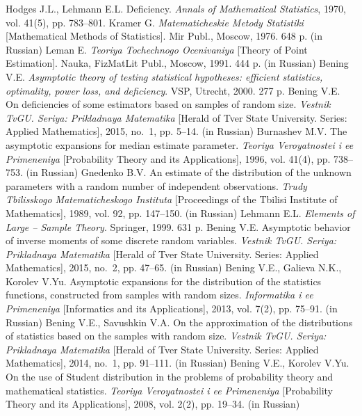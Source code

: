 \documentclass[a4paper,twoside]{article}
\theoremstyle{theorem}
\theoremstyle{remark}
\begin{document}
\bigskip\bigskip{}
\begin{thebibliography}{99}
\bibitem{} Hodges J.L., Lehmann E.L. Deficiency. {\it Annals of Mathematical Statistics}, 1970, vol. 41(5), pp. 783--801.
\bibitem{} Kramer G. {\it Matematicheskie Metody Statistiki} [Mathematical Methods of Statistics]. Mir Publ., Moscow, 1976. 648 p. (in Russian)
\bibitem{} Leman E. {\it Teoriya Tochechnogo Ocenivaniya} [Theory of Point Estimation]. Nauka, FizMatLit Publ., Moscow, 1991. 444 p. (in Russian)
\bibitem{} Bening V.E. {\it Asymptotic theory of testing statistical hypotheses: efficient statistics, optimality, power loss, and deficiency}. VSP, Utrecht, 2000. 277 p.
\bibitem{} Bening V.E. On deficiencies of some estimators based on samples of random size. {\it Vestnik TvGU. Seriya: Prikladnaya Matematika} [Herald of Tver State University. Series: Applied Mathematics], 2015, no.~1, pp. 5--14. (in Russian)
\bibitem{} Burnashev M.V. The asymptotic expansions for median estimate parameter. {\it Teoriya Veroyatnostei i ee Primeneniya} [Probability Theory and its Applications], 1996, vol. 41(4), pp. 738--753. (in Russian)
\bibitem{} Gnedenko B.V. An estimate of the distribution of the unknown parameters with a random number of independent observations. {\it Trudy Tbilisskogo Matematicheskogo Instituta} [Proceedings of the Tbilisi Institute of Mathematics], 1989, vol. 92, pp. 147--150. (in Russian)
\bibitem{} Lehmann E.L. {\it Elements of Large -- Sample Theory}. Springer, 1999. 631 p.
\bibitem{} Bening V.E. Asymptotic behavior of inverse moments of some discrete random variables. {\it Vestnik TvGU. Seriya: Prikladnaya Matematika} [Herald of Tver State University. Series: Applied Mathematics], 2015, no.~2, pp. 47--65. (in Russian)
\bibitem{} Bening V.E., Galieva N.K., Korolev V.Yu. Asymptotic expansions for the distribution of the statistics functions, constructed from samples with random sizes. {\it Informatika i ee Primeneniya} [Informatics and its Applications], 2013, vol. 7(2), pp. 75--91. (in Russian)
\bibitem{} Bening V.E., Savushkin V.A. On the approximation of the distributions of statistics based on the samples with random size. {\it Vestnik TvGU. Seriya: Prikladnaya Matematika} [Herald of Tver State University. Series: Applied Mathematics], 2014, no.~1, pp. 91--111. (in Russian)
\bibitem{} Bening V.E., Korolev V.Yu. On the use of Student distribution in the problems of probability theory and mathematical statistics. {\it Teoriya Veroyatnostei i ee Primeneniya} [Probability Theory and its Applications], 2008, vol. 2(2), pp. 19--34. (in Russian)

\end{thebibliography}
\end{document}
